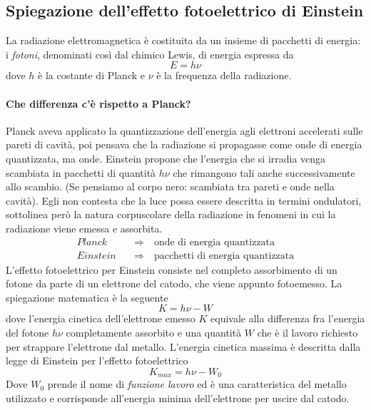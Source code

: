 \subsection{Spiegazione dell'effetto fotoelettrico di Einstein}
La radiazione elettromagnetica è costituita da un insieme di pacchetti di energia: i \textit{fotoni}, denominati così dal chimico Lewis, di energia espressa da
\begin{equation}
E = h \nu
\end{equation}
dove $h$ è la costante di Planck e $\nu$ è la frequenza della radiazione.

\paragraph{Che differenza c'è rispetto a Planck?}
Planck aveva applicato la quantizzazione dell'energia agli elettroni accelerati sulle pareti di cavità, poi pensava che la radiazione si propagasse come onde di energia quantizzata, ma onde.
Einstein propone che l'energia che si irradia venga scambiata in pacchetti di quantità $h\nu$ che rimangono tali anche successivamente allo scambio.
(Se pensiamo al corpo nero: scambiata tra pareti e onde nella cavità).
Egli non contesta che la luce possa essere descritta in termini ondulatori, sottolinea però la natura corpuscolare della radiazione in fenomeni in cui la radiazione viene emessa e assorbita.
\begin{equation}
\begin{split}
Planck \quad & \Rightarrow \quad \mbox{onde di energia quantizzata} \\
Einstein \quad & \Rightarrow \quad \mbox{pacchetti di energia quantizzata} 
\end{split}
\end{equation}
L'effetto fotoelettrico per Einstein consiste nel completo assorbimento di un fotone da parte di un elettrone del catodo, che viene appunto fotoemesso.
La spiegazione matematica è la seguente
\begin{equation}
K = h\nu - W
\end{equation}
dove l'energia cinetica dell'elettrone emesso $K$ equivale alla differenza fra l'energia del fotone $h\nu$ completamente assorbito e una quantità $W$ che è il lavoro richiesto per strappare l'elettrone dal metallo.
L'energia cinetica massima è descritta dalla legge di Einstein per l'effetto fotoelettrico
\begin{equation}
K_{max} = h\nu - W_0
\end{equation}
Dove $W_0$ prende il nome di \textit{funzione lavoro} ed è una caratteristica del metallo utilizzato e corrisponde all'energia minima dell'elettrone per uscire dal catodo.

